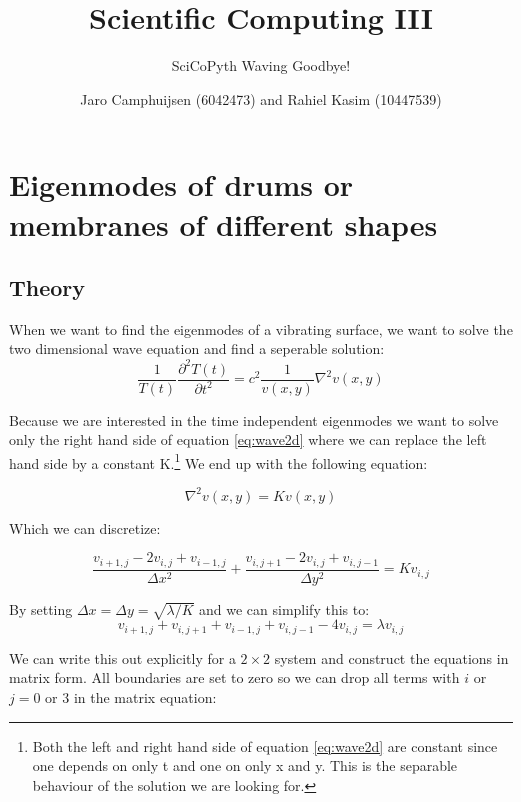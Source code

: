 \documentclass[a4paper]{article}
\author{Jaro Camphuijsen (6042473) and Rahiel Kasim (10447539)}
\title{Scientific Computing III}
\subtitle{SciCoPyth Waving Goodbye!}
\begin{document}
\maketitle

\tableofcontents

\section{Eigenmodes of drums or membranes of different shapes}
\subsection{Theory}
When we want to find the eigenmodes of a vibrating surface, we want to solve the two dimensional wave equation and find a seperable solution:
\begin{equation}
\frac{1}{T(t)}\frac{\partial ^2 T(t)}{\partial t^2} = c^2 \frac{1}{v(x,y)} \nabla ^2 v(x,y)
\label{eq:wave2d}
\end{equation}

Because we are interested in the time independent eigenmodes we want to solve only the right hand side of equation \ref{eq:wave2d} where we can replace the left hand side by a constant K.\footnote{Both the left and right hand side of equation \ref{eq:wave2d} are constant since one depends on only t and one on only x and y. This is the separable behaviour of the solution we are looking for.} We end up with the following equation:

\begin{equation}
\nabla ^2 v(x,y) = K v(x,y)
\label{eq:wavexy}
\end{equation}

Which we can discretize:

\begin{equation}
\frac{v_{i+1,j} - 2v_{i,j} + v_{i-1,j}}{\Delta x^2} + \frac{v_{i,j+1} - 2v_{i,j} + v_{i,j-1}}{\Delta y^2} =
K v_{i,j}
\label{eq:waveDiscr}
\end{equation}

By setting $\Delta x = \Delta y = \sqrt{\lambda / K}$ and we can simplify this to:
\begin{equation}
 v_{i+1,j} + v_{i,j+1} + v_{i-1,j} + v_{i,j-1} - 4v_{i,j} = \lambda v_{i,j}
\label{eq:waveDiscrSimp}
\end{equation}

We can write this out explicitly for a $2\times2$ system and construct the equations in matrix form. All boundaries are set to zero so we can drop all terms with $i$ or $j = 0$ or $3$ in the matrix equation:
\end{document}
